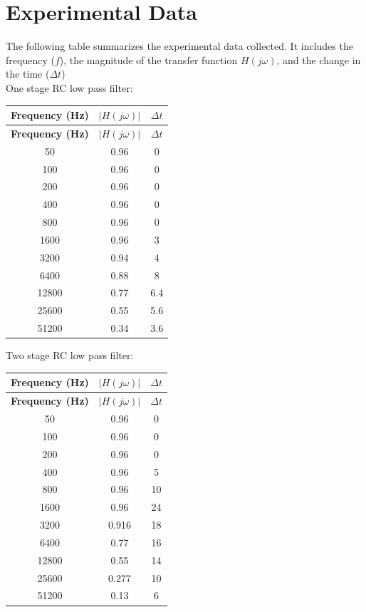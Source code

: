 \documentclass[a4paper,12pt]{article}
\begin{document}
\section{Experimental Data}
The following table summarizes the experimental data collected. It includes the frequency ($f$), the magnitude of the transfer function $H(j\omega)$, and the change in the time ($\Delta t$)\\
One stage RC low pass filter:\\
\begin{longtable}{|c|c|c|}
\hline
\textbf{Frequency (Hz)} & \textbf{$|H(j\omega)|$} & \textbf{$\Delta t$} \\
\hline
\endfirsthead
\hline
\textbf{Frequency (Hz)} & \textbf{$|H(j\omega)|$} & \textbf{$\Delta t$} \\
\hline
\endhead
\hline
\endfoot
\hline
\endlastfoot
50 & 0.96 & 0 \\
100 & 0.96 & 0 \\
200 & 0.96 & 0 \\
400 & 0.96 & 0 \\
800 & 0.96 & 0 \\
1600 & 0.96 & 3 \\
3200 & 0.94 & 4 \\
6400 & 0.88 & 8 \\
12800 & 0.77 & 6.4 \\
25600 & 0.55 & 5.6 \\
51200 & 0.34 & 3.6 \\
\end{longtable}
\pagebreak
Two stage RC low pass filter:\\
\begin{longtable}{|c|c|c|}
\hline
\textbf{Frequency (Hz)} & \textbf{$|H(j\omega)|$} & \textbf{$\Delta t$} \\
\hline
\endfirsthead
\hline
\textbf{Frequency (Hz)} & \textbf{$|H(j\omega)|$} & \textbf{$\Delta t$} \\
\hline
\endhead
\hline
\endfoot
\hline
\endlastfoot
50 & 0.96 & 0 \\
100 & 0.96 & 0 \\
200 & 0.96 & 0 \\
400 & 0.96 & 5 \\
800 & 0.96 & 10 \\
1600 & 0.96 & 24 \\
3200 & 0.916 & 18 \\
6400 & 0.77 & 16 \\
12800 & 0.55 & 14 \\
25600 & 0.277 & 10 \\
51200 & 0.13 & 6 \\
\end{longtable}
\end{document}

